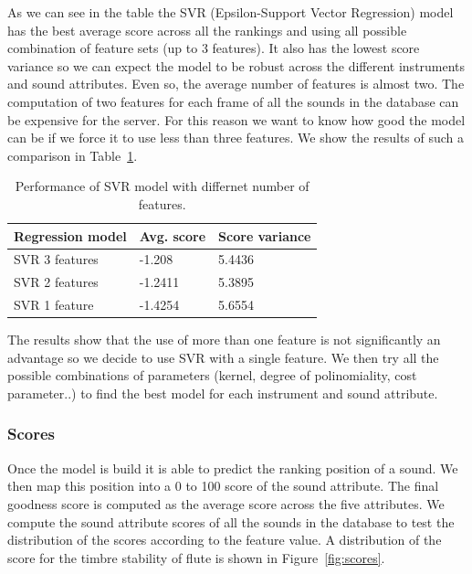 \documentclass{article}
\begin{document}
As we can see in the table the SVR (Epsilon-Support Vector Regression) model has the best average score across all the rankings and using all possible combination of feature sets (up to 3 features). It also has the lowest score variance so we can expect the model to be robust across the different instruments and sound attributes. Even so, the average number of features is almost two. The computation of two features for each frame of all the sounds in the database can be expensive for the server. For this reason we want to know how good the model can be if we force it to use less than three features. We show the results of such a comparison in Table~\ref{svr}.

\begin{table}[]
\centering
\label{my-label}
\begin{tabular}{lll}
\hline
Regression model & Avg. score & Score variance \\ \hline
SVR 3 features   & -1.208     & 5.4436         \\
SVR 2 features   & -1.2411    & 5.3895         \\
SVR 1 feature    & -1.4254    & 5.6554         \\ \hline
\end{tabular}
\caption{Performance of SVR model with differnet number of features.}
\label{svr}
\end{table}

The results show that the use of more than one feature is not significantly an advantage so we decide to use SVR with a single feature. We then try all the possible combinations of parameters (kernel, degree of polinomiality, cost parameter..) to find the best model for each instrument and sound attribute.

\subsubsection{Scores}
Once the model is build it is able to predict the ranking position of a sound. We then map this position into a 0 to 100 score of the sound attribute. The final goodness score is computed as the average score across the five attributes. We compute the sound attribute scores of all the sounds in the database to test the distribution of the scores according to the feature value. A distribution of the score for the timbre stability of flute is shown in Figure~\ref{fig:scores}.
\end{document}
